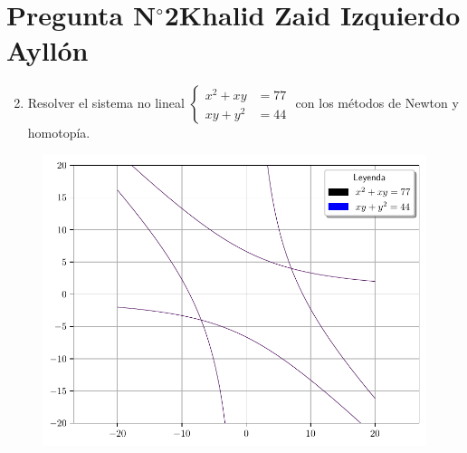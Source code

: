 \section{Pregunta N$^{\circ}$2\qquad Khalid Zaid Izquierdo Ayllón}

\begin{frame}
	\begin{enumerate}\setcounter{enumi}{1}
		\item

		      Resolver el sistema no lineal
		      \begin{math}
			      \left\{
			      \begin{aligned}
				      x^{2} + xy  & = 77 \\
				      xy  + y^{2} & = 44
			      \end{aligned}
			      \right.
		      \end{math}
		      con los métodos de Newton y
		      homotopía.
	\end{enumerate}

	\begin{solution}
		\begin{figure}[ht!]
			\centering
			\includegraphics[width=0.5\paperwidth]{p2}
		\end{figure}
	\end{solution}
\end{frame}